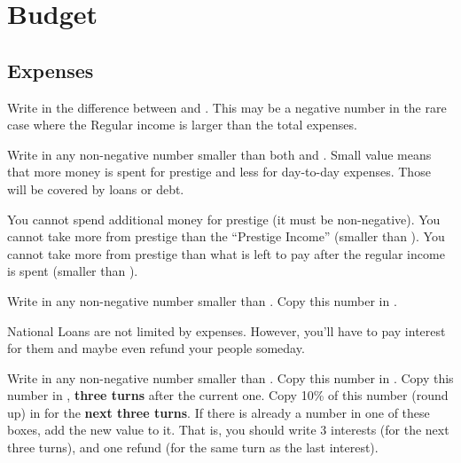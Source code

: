 \section{Budget}\label{chBudget:Budget}
\subsection{Expenses}
 Write in  the
difference between  and .
\bparag This may be a negative number in the rare case where the Regular
income is larger than the total expenses.

 Write in  any non-negative
number smaller than both  and
.
\bparag Small value means that more money is spent for prestige \VPs and less
for day-to-day expenses. Those will be covered by loans or debt.

\begin{designnote}
  You cannot spend additional money for prestige (it must be non-negative).
  You cannot take more from prestige than the ``Prestige Income'' (smaller
  than ).  You cannot take more from prestige
  than what is left to pay after the regular income is spent (smaller than
  ).
\end{designnote}

 Write in  any non-negative
number smaller than .
\bparag Copy this number in .

\begin{designnote}
  National Loans are not limited by expenses. However, you'll have to pay
  interest for them and maybe even refund your people someday.
\end{designnote}

 Write in  any
non-negative number smaller than .
\bparag Copy this number in .
\bparag Copy this number in ,
\textbf{three turns} after the current one.
\bparag Copy 10\% of this number (round up) in  for the \textbf{next three turns}. If there is already a
number in one of these boxes, add the new value to it.
\bparag That is, you should write 3 interests (for the next three turns), and
one refund (for the same turn as the last interest).

